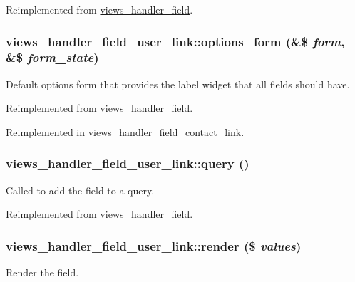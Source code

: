 Reimplemented from \hyperlink{classviews__handler__field_a3d50050864c255b71c842972a45d39f6}{views\_\-handler\_\-field}.\hypertarget{classviews__handler__field__user__link_a952944015feaaab1fb2d0abc29d5c2b5}{
\subsubsection[{options\_\-form}]{\setlength{\rightskip}{0pt plus 5cm}views\_\-handler\_\-field\_\-user\_\-link::options\_\-form (\&\$ {\em form}, \/  \&\$ {\em form\_\-state})}}
\label{classviews__handler__field__user__link_a952944015feaaab1fb2d0abc29d5c2b5}
Default options form that provides the label widget that all fields should have. 

Reimplemented from \hyperlink{classviews__handler__field_a0435d161922b7b4b84f02a2e79bb947a}{views\_\-handler\_\-field}.

Reimplemented in \hyperlink{classviews__handler__field__contact__link_ad6709f7a6f48dc51fe3952f26598e622}{views\_\-handler\_\-field\_\-contact\_\-link}.\hypertarget{classviews__handler__field__user__link_ab64eedee54360407b203c3d7474c40f2}{
\subsubsection[{query}]{\setlength{\rightskip}{0pt plus 5cm}views\_\-handler\_\-field\_\-user\_\-link::query ()}}
\label{classviews__handler__field__user__link_ab64eedee54360407b203c3d7474c40f2}
Called to add the field to a query. 

Reimplemented from \hyperlink{classviews__handler__field_a4f661f91bcbe80d4a00c30a31456c502}{views\_\-handler\_\-field}.\hypertarget{classviews__handler__field__user__link_af81b37cfa8e0c2363ad8ed9bb601cd14}{
\subsubsection[{render}]{\setlength{\rightskip}{0pt plus 5cm}views\_\-handler\_\-field\_\-user\_\-link::render (\$ {\em values})}}
\label{classviews__handler__field__user__link_af81b37cfa8e0c2363ad8ed9bb601cd14}
Render the field.


